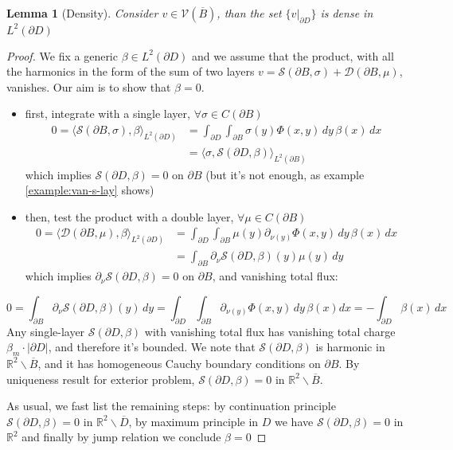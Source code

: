 \documentclass[10pt, a4paper, twoside, openright]{book}
\theoremstyle{definition}
\theoremstyle{plain}
\theoremstyle{plain}
\theoremstyle{plain}
\theoremstyle{plain}
\theoremstyle{plain}
\newtheorem{lemma}[subsection]{Lemma}
\theoremstyle{plain}
\theoremstyle{plain}
\theoremstyle{plain}
\begin{document}
\begin{lemma}[Density]
\label{lemma:density-V-0}
 Consider $v\in \mathcal{V}(\overline{B})$, than the set $\{v|_{\partial D}\}$ is dense in $L^2(\partial D)$
\end{lemma}
\begin{proof}
 We fix a generic $\beta \in L^2(\partial D)$ and we assume that the product, with all the harmonics in the form of the sum of two layers $v=\mathcal{S}(\partial B,\sigma) + \mathcal{D}(\partial B, \mu)$, vanishes. Our aim is to show that $\beta=0$.
 \begin{itemize}
  \item first, integrate with a single layer, $\forall\sigma\in C(\partial B)$
 \begin{align*}
  0=\langle\mathcal{S}({\partial B},\sigma), \beta\rangle_{L^2(\partial D)} &= \int_{\partial D} \int_{\partial B} \sigma(y) \Phi(x,y)\,dy\,\beta(x)\,dx \\ &= \langle\sigma, \mathcal{S}({\partial D},\beta)\rangle_{L^2(\partial B)}
 \end{align*}
 which implies $\mathcal{S}(\partial D,\beta) = 0$ on $\partial B$ (but it's not enough, as example \ref{example:van-s-lay} shows)
 \item then, test the product with a double layer, $\forall \mu\in C(\partial B)$
 \begin{align*}
  0=\langle\mathcal{D}({\partial B},\mu), \beta\rangle_{L^2(\partial D)} &= \int_{\partial D} \int_{\partial B} \mu(y) \partial_{\nu(y)}\Phi(x,y)\,dy\,\beta(x)\,dx \\&= \int_{\partial B} \partial_\nu \mathcal{S}(\partial D, \beta)(y) \mu(y)\, dy
 \end{align*}
 which implies $\partial_\nu \mathcal{S}(\partial D, \beta) = 0$ on $\partial B$, and vanishing total flux:
 \end{itemize}
 \begin{equation*}
  0=\int_{\partial B} \partial_\nu \mathcal{S}(\partial D,\beta)(y)\,dy =\int_{\partial D} \int_{\partial B} \partial_{\nu(y)} \Phi(x,y)\, dy \, \beta(x) dx = - \int_{\partial D} \beta(x) \, dx
 \end{equation*}
 Any single-layer $\mathcal{S}(\partial D, \beta)$ with vanishing total flux has vanishing total charge $\beta_m\cdot |\partial D|$, and therefore it's bounded. 
 We note that $\mathcal{S}(\partial D, \beta)$ is harmonic in $\mathbb{R}^2\backslash\overline{B}$, and it has homogeneous Cauchy boundary conditions on $\partial B$.
 By uniqueness result for exterior problem, $\mathcal{S}(\partial D,\beta) = 0$ in $\mathbb{R}^2\backslash\overline{B}$. 
 \par
 As usual, we fast list the remaining steps: by continuation principle $\mathcal{S}(\partial D,\beta) = 0$ in $\mathbb{R}^2\backslash\overline{D}$,
 by maximum principle in $D$ we have $\mathcal{S}(\partial D,\beta) = 0$ in $\mathbb{R}^2$ 
 and finally by jump relation we conclude $\beta = 0$
\end{proof}
\end{document}
